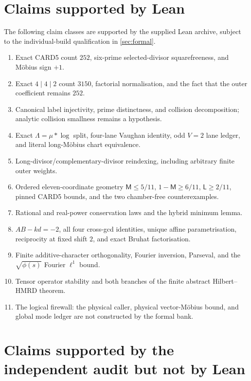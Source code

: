 \section{Claims supported by Lean}\label{app:leanclaims}

The following claim classes are supported by the supplied Lean archive, subject
to the individual-build qualification in \cref{sec:formal}.
\begin{enumerate}[label=\textup{L\arabic*.},leftmargin=3em]
\item Exact CARD5 count $252$, six-prime selected-divisor squarefreeness, and
      M\"obius sign $+1$.
\item Exact $4\mid4\mid2$ count $3150$, factorial normalisation, and the fact
      that the outer coefficient remains $252$.
\item Canonical label injectivity, prime distinctness, and collision
      decomposition; analytic collision smallness remains a hypothesis.
\item Exact $\Lambda=\mu*\log$ split, four-lane Vaughan identity, odd $V=2$
      lane ledger, and literal long-M\"obius chart equivalence.
\item Long-divisor/complementary-divisor reindexing, including arbitrary finite
      outer weights.
\item Ordered eleven-coordinate geometry $\mathsf M\le5/11$,
      $1-\mathsf M\ge6/11$, $\mathsf L\ge2/11$, pinned CARD5 bounds, and the two
      chamber-free counterexamples.
\item Rational and real-power conservation laws and the hybrid minimum lemma.
\item $AB-kd=-2$, all four cross-gcd identities, unique affine
      parametrisation, reciprocity at fixed shift $2$, and exact Bruhat
      factorisation.
\item Finite additive-character orthogonality, Fourier inversion, Parseval, and
      the $\sqrt{\phi(s)}$ Fourier $\ell^1$ bound.
\item Tensor operator stability and both branches of the finite abstract
      Hilbert--HMRD theorem.
\item The logical firewall: the physical caller, physical vector-M\"obius
      bound, and global mode ledger are not constructed by the formal bank.
\end{enumerate}

\section{Claims supported by the independent audit but not by Lean}\label{app:opusclaims}

